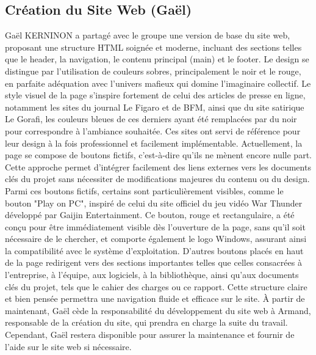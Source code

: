 \documentclass{report}
\begin{document}
\subsection*{Création du Site Web (Gaël)}
Gaël KERNINON a partagé avec le groupe une version de base du site web, proposant une structure HTML soignée et moderne, incluant des sections telles que le header, la navigation, le contenu principal (main) et le footer. Le design se distingue par l'utilisation de couleurs sobres, principalement le noir et le rouge, en parfaite adéquation avec l'univers mafieux qui domine l'imaginaire collectif. Le style visuel de la page s'inspire fortement de celui des articles de presse en ligne, notamment les sites du journal Le Figaro et de BFM, ainsi que du site satirique Le Gorafi, les couleurs bleues de ces derniers ayant été remplacées par du noir pour correspondre à l'ambiance souhaitée. Ces sites ont servi de référence pour leur design à la fois professionnel et facilement implémentable. Actuellement, la page se compose de boutons fictifs, c'est-à-dire qu'ils ne mènent encore nulle part. Cette approche permet d'intégrer facilement des liens externes vers les documents clés du projet sans nécessiter de modifications majeures du contenu ou du design. Parmi ces boutons fictifs, certains sont particulièrement visibles, comme le bouton "Play on PC", inspiré de celui du site officiel du jeu vidéo War Thunder développé par Gaijin Entertainment. Ce bouton, rouge et rectangulaire, a été conçu pour être immédiatement visible dès l'ouverture de la page, sans qu’il soit nécessaire de le chercher, et comporte également le logo Windows, assurant ainsi la compatibilité avec le système d’exploitation. D’autres boutons placés en haut de la page redirigent vers des sections importantes telles que celles consacrées à l’entreprise, à l’équipe, aux logiciels, à la bibliothèque, ainsi qu’aux documents clés du projet, tels que le cahier des charges ou ce rapport. Cette structure claire et bien pensée permettra une navigation fluide et efficace sur le site. 
À partir de maintenant, Gaël cède la responsabilité du développement du site web à Armand, responsable de la création du site, qui prendra en charge la suite du travail. Cependant, Gaël restera disponible pour assurer la maintenance et fournir de l'aide sur le site web si nécessaire.
\end{document}
